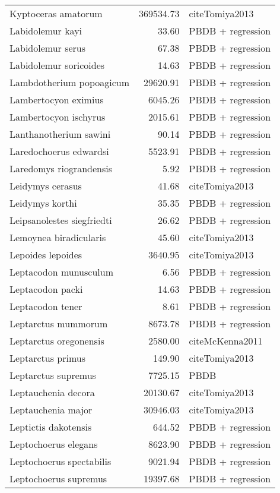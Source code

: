 \begin{table}[ht]
\begin{tabular}{lrl}
  Kyptoceras amatorum & 369534.73 & cite{Tomiya2013} \\ 
  Labidolemur kayi & 33.60 & PBDB + regression \\ 
  Labidolemur serus & 67.38 & PBDB + regression \\ 
  Labidolemur soricoides & 14.63 & PBDB + regression \\ 
  Lambdotherium popoagicum & 29620.91 & PBDB + regression \\ 
  Lambertocyon eximius & 6045.26 & PBDB + regression \\ 
  Lambertocyon ischyrus & 2015.61 & PBDB + regression \\ 
  Lanthanotherium sawini & 90.14 & PBDB + regression \\ 
  Laredochoerus edwardsi & 5523.91 & PBDB + regression \\ 
  Laredomys riograndensis & 5.92 & PBDB + regression \\ 
  Leidymys cerasus & 41.68 & cite{Tomiya2013} \\ 
  Leidymys korthi & 35.35 & PBDB + regression \\ 
  Leipsanolestes siegfriedti & 26.62 & PBDB + regression \\ 
  Lemoynea biradicularis & 45.60 & cite{Tomiya2013} \\ 
  Lepoides lepoides & 3640.95 & cite{Tomiya2013} \\ 
  Leptacodon munusculum & 6.56 & PBDB + regression \\ 
  Leptacodon packi & 14.63 & PBDB + regression \\ 
  Leptacodon tener & 8.61 & PBDB + regression \\ 
  Leptarctus mummorum & 8673.78 & PBDB + regression \\ 
  Leptarctus oregonensis & 2580.00 & cite{McKenna2011} \\ 
  Leptarctus primus & 149.90 & cite{Tomiya2013} \\ 
  Leptarctus supremus & 7725.15 & PBDB \\ 
  Leptauchenia decora & 20130.67 & cite{Tomiya2013} \\ 
  Leptauchenia major & 30946.03 & cite{Tomiya2013} \\ 
  Leptictis dakotensis & 644.52 & PBDB + regression \\ 
  Leptochoerus elegans & 8623.90 & PBDB + regression \\ 
  Leptochoerus spectabilis & 9021.94 & PBDB + regression \\ 
  Leptochoerus supremus & 19397.68 & PBDB + regression \\ 

\end{tabular}
\end{table}
